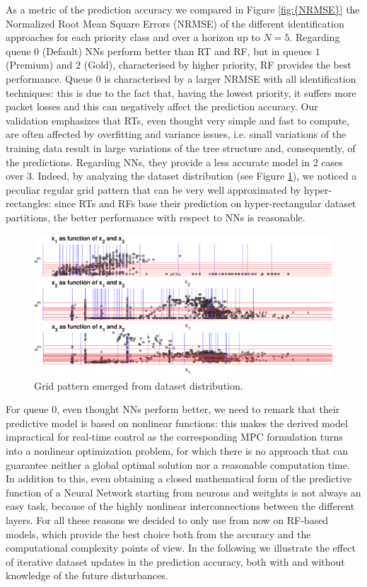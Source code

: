 As a metric of the prediction accuracy we compared in Figure \ref{fig:{NRMSE}} the Normalized Root Mean Square Errors (NRMSE) of the different identification approaches for each priority class and over a horizon up to $N=5$. Regarding queue $0$ (Default) NNs perform better than RT and RF, but in queues $1$ (Premium) and $2$ (Gold), characterised by higher priority, RF provides the best performance. Queue $0$ is characterised by a larger NRMSE with all identification techniques: this is due to the fact that, having the lowest priority, it suffers more packet losses and this can negatively affect the prediction accuracy. Our validation emphasizes that RTs, even thought very simple and fast to compute, are often affected by overfitting and variance issues, i.e. small variations of the training data result in large variations of the tree structure and, consequently, of the predictions. Regarding NNs, they provide a less accurate model in 2 cases over 3. Indeed, by analyzing the dataset distribution (see Figure \ref{fig:{datadistribution}}), we noticed a peculiar regular grid pattern that can be very well approximated by hyper-rectangles: since RTs and RFs base their prediction on hyper-rectangular dataset partitions, the better performance with respect to NNs is reasonable.
\begin{figure}[h!]
	\includegraphics[width=\linewidth]{figure/datadistribution.eps}
	\caption{Grid pattern emerged from dataset distribution.}
	\label{fig:{datadistribution}}
\end{figure}
For queue 0, even thought NNs perform better, we need to remark that their predictive model is based on nonlinear functions: this makes the derived model impractical for real-time control as the corresponding MPC formulation turns into a nonlinear optimization problem, for which there is no approach that can guarantee neither a global optimal solution nor a reasonable computation time. In addition to this, even obtaining a closed mathematical form of the predictive function of a Neural Network starting from neurons and weitghts is not always an easy task, because of the highly nonlinear interconnections between the different layers. For all these reasons we decided to only use from now on RF-based models, which provide the best choice both from the accuracy and the computational complexity points of view. In the following we illustrate the effect of iterative dataset updates in the prediction accuracy, both with and without knowledge of the future disturbances.
